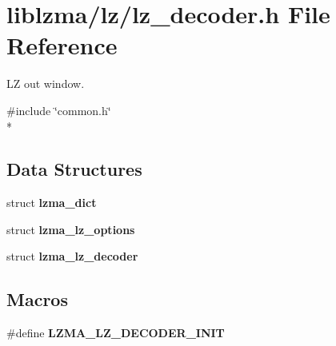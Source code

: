\section{liblzma/lz/lz\-\_\-decoder.h File Reference}
\label{lz__decoder_8h}


L\-Z out window.  


{\ttfamily \#include \char`\"{}common.\-h\char`\"{}}\\*
\subsection*{Data Structures}
\begin{DoxyCompactItemize}
\item 
struct {\bf lzma\-\_\-dict}
\item 
struct {\bf lzma\-\_\-lz\-\_\-options}
\item 
struct {\bf lzma\-\_\-lz\-\_\-decoder}
\end{DoxyCompactItemize}
\subsection*{Macros}
\begin{DoxyCompactItemize}
\item 
\#define {\bfseries L\-Z\-M\-A\-\_\-\-L\-Z\-\_\-\-D\-E\-C\-O\-D\-E\-R\-\_\-\-I\-N\-I\-T}
\end{DoxyCompactItemize}
